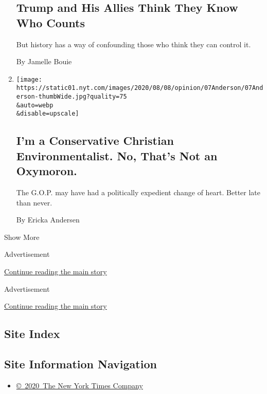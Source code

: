 \begin{enumerate}
  \hypertarget{trump-and-his-allies-think-they-know-who-counts}{%
  \subsection{Trump and His Allies Think They Know Who
  Counts}\label{trump-and-his-allies-think-they-know-who-counts}}

  But history has a way of confounding those who think they can control
  it.

  By Jamelle Bouie
\item
  \href{/2020/08/07/opinion/republicans-climate-change.html}{}

  \texttt{[image: https://static01.nyt.com/images/2020/08/08/opinion/07Anderson/07Anderson-thumbWide.jpg?quality=75\\\&auto=webp\\\&disable=upscale]}

  \hypertarget{im-a-conservative-christian-environmentalist-no-thats-not-an-oxymoron}{%
  \subsection{I'm a Conservative Christian Environmentalist. No, That's
  Not an
  Oxymoron.}\label{im-a-conservative-christian-environmentalist-no-thats-not-an-oxymoron}}

  The G.O.P. may have had a politically expedient change of heart.
  Better late than never.

  By Ericka Andersen
\end{enumerate}

Show More

Advertisement

\protect\hyperlink{after-mid2}{Continue reading the main story}

Advertisement

\protect\hyperlink{after-mktg}{Continue reading the main story}

\hypertarget{site-index}{%
\subsection{Site Index}\label{site-index}}

\hypertarget{site-information-navigation}{%
\subsection{Site Information
Navigation}\label{site-information-navigation}}

\begin{itemize}
\tightlist
\item
  \href{https://help.nytimes.com/hc/en-us/articles/115014792127-Copyright-notice}{©~2020~The
  New York Times Company}
\end{itemize}

